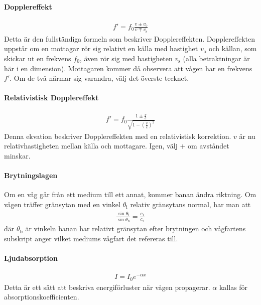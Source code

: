 \paragraph{Dopplereffekt}
\begin{align*}
	f' = f_0\frac{v\pm v_{\text{o}}}{v\mp v_{\text{s}}}
\end{align*}
Detta är den fullständiga formeln som beskriver Dopplereffekten. Dopplereffekten uppstår om en mottagar rör sig relativt en källa med hastighet $v_{\text{o}}$ och källan, som skickar ut en frekvens $f_0$, även rör sig med hastigheten $v_{\text{s}}$ (alla betraktningar är här i en dimension). Mottagaren kommer då observera att vågen har en frekvens $f'$. Om de två närmar sig varandra, välj det överste tecknet.

\deriv

\paragraph{Relativistisk Dopplereffekt}
\begin{align*}
	f' = f_0\frac{1\pm\frac{v}{c}}{\sqrt{1 - \left(\frac{v}{c}\right)^2}}
\end{align*}
Denna ekvation beskriver Dopplereffekten med en relativistisk korrektion. $v$ är nu relativhastigheten mellan källa och mottagare. Igen, välj $+$ om avståndet minskar.

\paragraph{Brytningslagen}
Om en våg går från ett medium till ett annat, kommer banan ändra riktning. Om vågen träffer gränsytan med en vinkel $\theta_{\text{i}}$ relativ gränsytans normal, har man att
\begin{align*}
	\frac{\sin{\theta_{\text{i}}}}{\sin{\theta_{\text{b}}}} = \frac{c_{1}}{c_{2}}
\end{align*}
där $\theta_{\text{b}}$ är vinkeln banan har relativt gränsytan efter brytningen och vågfartens subskript anger vilket mediums vågfart det refereras till.

\deriv

\paragraph{Ljudabsorption}
\begin{align*}
	I = I_0e^{-\alpha x}
\end{align*}
Detta är ett sätt att beskriva energiförluster när vågen propagerar. $\alpha$ kallas för absorptionskoefficienten.

